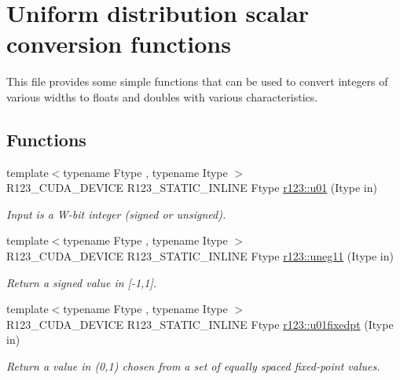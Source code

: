 \hypertarget{group__uniform}{}\section{Uniform distribution scalar conversion functions}
\label{group__uniform}


This file provides some simple functions that can be used to convert integers of various widths to floats and doubles with various characteristics.  


\subsection*{Functions}
\begin{DoxyCompactItemize}
\item 
{\footnotesize template$<$typename Ftype , typename Itype $>$ }\\R123\+\_\+\+C\+U\+D\+A\+\_\+\+D\+E\+V\+I\+CE R123\+\_\+\+S\+T\+A\+T\+I\+C\+\_\+\+I\+N\+L\+I\+NE Ftype \hyperlink{group__uniform_gafc96ad616364743e209c836450cc4107}{r123\+::u01} (Itype in)
\begin{DoxyCompactList}\small\item\em Input is a W-\/bit integer (signed or unsigned). \end{DoxyCompactList}\item 
{\footnotesize template$<$typename Ftype , typename Itype $>$ }\\R123\+\_\+\+C\+U\+D\+A\+\_\+\+D\+E\+V\+I\+CE R123\+\_\+\+S\+T\+A\+T\+I\+C\+\_\+\+I\+N\+L\+I\+NE Ftype \hyperlink{group__uniform_ga49eb4e2f3522f1b5e22b66bdc86345ce}{r123\+::uneg11} (Itype in)
\begin{DoxyCompactList}\small\item\em Return a signed value in \mbox{[}-\/1,1\mbox{]}. \end{DoxyCompactList}\item 
{\footnotesize template$<$typename Ftype , typename Itype $>$ }\\R123\+\_\+\+C\+U\+D\+A\+\_\+\+D\+E\+V\+I\+CE R123\+\_\+\+S\+T\+A\+T\+I\+C\+\_\+\+I\+N\+L\+I\+NE Ftype \hyperlink{group__uniform_ga6d75b90f162a67226c8044c6f3198b96}{r123\+::u01fixedpt} (Itype in)
\begin{DoxyCompactList}\small\item\em Return a value in (0,1) chosen from a set of equally spaced fixed-\/point values. \end{DoxyCompactList}\end{DoxyCompactItemize}


